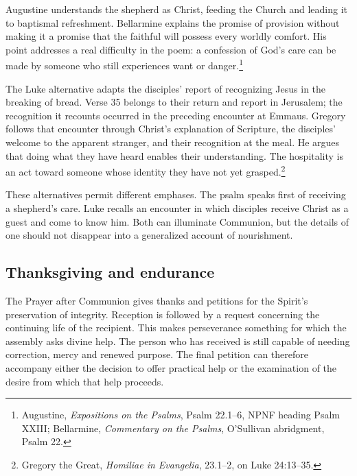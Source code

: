 Augustine understands the shepherd as Christ, feeding the Church and leading it to baptismal refreshment. Bellarmine explains the promise of provision without making it a promise that the faithful will possess every worldly comfort. His point addresses a real difficulty in the poem: a confession of God's care can be made by someone who still experiences want or danger.\footnote{Augustine, \textit{Expositions on the Psalms}, Psalm 22.1--6, NPNF heading Psalm XXIII; Bellarmine, \textit{Commentary on the Psalms}, O'Sullivan abridgment, Psalm 22.}

The Luke alternative adapts the disciples' report of recognizing Jesus in the breaking of bread. Verse 35 belongs to their return and report in Jerusalem; the recognition it recounts occurred in the preceding encounter at Emmaus. Gregory follows that encounter through Christ's explanation of Scripture, the disciples' welcome to the apparent stranger, and their recognition at the meal. He argues that doing what they have heard enables their understanding. The hospitality is an act toward someone whose identity they have not yet grasped.\footnote{Gregory the Great, \textit{Homiliae in Evangelia}, 23.1--2, on Luke 24:13--35.}

These alternatives permit different emphases. The psalm speaks first of receiving a shepherd's care. Luke recalls an encounter in which disciples receive Christ as a guest and come to know him. Both can illuminate Communion, but the details of one should not disappear into a generalized account of nourishment.

\subsection{Thanksgiving and endurance}
The Prayer after Communion gives thanks and petitions for the Spirit's preservation of integrity. Reception is followed by a request concerning the continuing life of the recipient. This makes perseverance something for which the assembly asks divine help. The person who has received is still capable of needing correction, mercy and renewed purpose. The final petition can therefore accompany either the decision to offer practical help or the examination of the desire from which that help proceeds.
